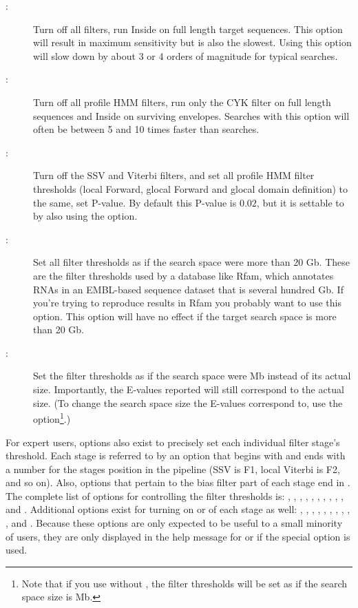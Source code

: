 \begin{description}
\item[:] Turn off all filters, run Inside on full length
  target sequences. This option will result in maximum sensitivity but
  is also the slowest. Using this option will slow down
   by about 3 or 4 orders of magnitude for typical
  searches.
\item[:] Turn off all profile HMM filters, run only the
  CYK filter on full length sequences and Inside on surviving
  envelopes. Searches with this option will often be between 5 and
  10 times faster than  searches.
\item[:] Turn off the SSV and Viterbi filters, and set
  all profile HMM filter thresholds (local Forward, glocal Forward and
  glocal domain definition) to the same, set P-value. By default this
  P-value is $0.02$, but it is settable to  by also using
  the  option. 
\item[:] Set all filter thresholds as if the search
  space were more than 20 Gb. These are the filter thresholds used by
  a database like Rfam, which annotates RNAs in an EMBL-based sequence
  dataset that is several hundred Gb. If you're trying to
  reproduce results in Rfam you probably want to use this option.
  This option will have no effect if the target search space is more
  than 20 Gb. 
\item[:] Set the filter thresholds as if the search space
  were  Mb instead of its actual size. Importantly, the E-values
  reported will still correspond to the actual size. (To change the
  search space size the E-values correspond to, use the 
  option\footnote{Note that if you use  without
  , the filter thresholds will be set as if the
  search space size is  Mb.}.)
\end{description}

For expert users, options also exist to precisely set each individual
filter stage's threshold. Each stage is referred to by an option that
begins with  and ends with a number for the stages position
in the pipeline (SSV is F1, local Viterbi is F2, and so on). Also,
options that pertain to the bias filter part of each stage end in
. The complete list of options for controlling the filter
thresholds is: , , ,
, , , ,
, , , and
. Additional options exist for turning on or of each stage
as well: , , ,
, , , ,
, , , and .
Because these options are only expected to be useful to a small
minority of users, they are only displayed in the help message for
 or  if the special 
option is used.

